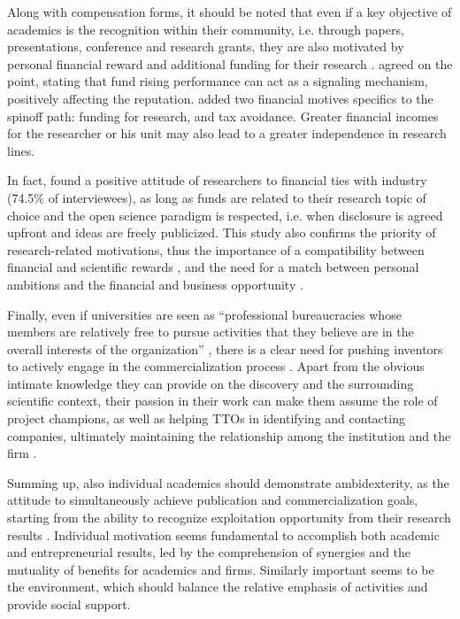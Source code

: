 Along with compensation forms, it should be noted that even if a key objective of academics is the recognition within their community, i.e. through papers, presentations, conference and research grants, they are also motivated by personal financial reward and additional funding for their research \citep{Siegel2003a, Link2007, Fini2009}. \citet{DEste2007, DEste2011} agreed on the point, stating that fund rising performance can act as a signaling mechanism, positively affecting the reputation. \citet{Rizzo2015} added two financial motives specifics to the spinoff path: funding for research, and tax avoidance. Greater financial incomes for the researcher or his unit may also lead to a greater independence in research lines.

In fact, \citet{DEste2011} found a positive attitude of researchers to financial ties with industry (74.5\% of interviewees), as long as funds are related to their research topic of choice and the open science paradigm is respected, i.e. when disclosure is agreed upfront and ideas are freely publicized. This study also confirms the priority of research-related motivations, thus the importance of a compatibility between financial and scientific rewards \citep{Baldini2007, Link2007}, and the need for a match between personal ambitions and the financial and business opportunity \citep{Tijssen2006}.

Finally, even if universities are seen as \enquote{professional bureaucracies whose members are relatively free to pursue activities that they believe are in the overall interests of the organization} \citep{DEste2011}, there is a clear need for pushing inventors to actively engage in the commercialization process \citep{Jensen1998}. Apart from the obvious intimate knowledge they can provide on the discovery and the surrounding scientific context, their passion in their work can make them assume the role of project champions, as well as helping TTOs in identifying and contacting companies, ultimately maintaining the relationship among the institution and the firm \citep{Markman2005}.

Summing up, also individual academics should demonstrate ambidexterity, as the attitude to simultaneously achieve publication and commercialization goals, starting from the ability to recognize exploitation opportunity from their research results \citep{Chang2016}. Individual motivation seems fundamental to accomplish both academic and entrepreneurial results, led by the comprehension of synergies and the mutuality of benefits for academics and firms. Similarly important seems to be the environment, which should balance the relative emphasis of activities and provide social support. 

